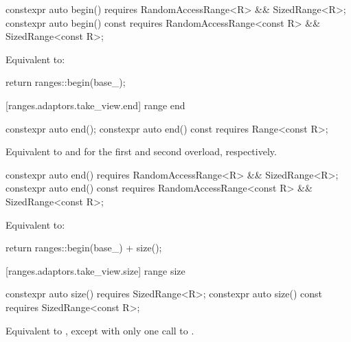 %
\begin{itemdecl}
constexpr auto begin() requires RandomAccessRange<R> && SizedRange<R>;
constexpr auto begin() const
requires RandomAccessRange<const R> && SizedRange<const R>;
\end{itemdecl}

\begin{itemdescr}
\pnum
\effects Equivalent to:
\begin{codeblock}
return ranges::begin(base_);
\end{codeblock}
\end{itemdescr}

[ranges.adaptors.take_view.end]{ range end}

%
\begin{itemdecl}
constexpr auto end();
constexpr auto end() const requires Range<const R>;
\end{itemdecl}

\begin{itemdescr}
\pnum
\effects Equivalent to  and
 for the first and second
overload, respectively.
\end{itemdescr}

%
\begin{itemdecl}
constexpr auto end() requires RandomAccessRange<R> && SizedRange<R>;
constexpr auto end() const
requires RandomAccessRange<const R> && SizedRange<const R>;
\end{itemdecl}

\begin{itemdescr}
\pnum
\effects Equivalent to:
\begin{codeblock}
return ranges::begin(base_) + size();
\end{codeblock}
\end{itemdescr}

[ranges.adaptors.take_view.size]{ range size}

%
\begin{itemdecl}
constexpr auto size() requires SizedRange<R>;
constexpr auto size() const requires SizedRange<const R>;
\end{itemdecl}

\begin{itemdescr}
\pnum
\effects Equivalent to
, except with
only one call to .
\end{itemdescr}


